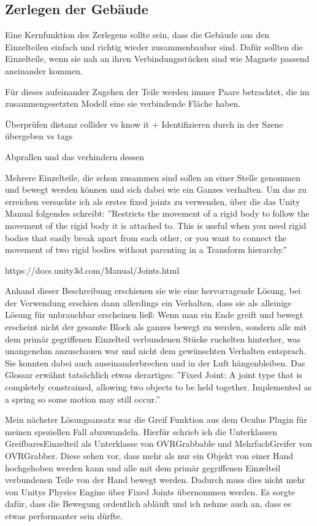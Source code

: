 \documentclass[11pt]{article} %
\begin{document}
\subsection{Zerlegen der Gebäude}

Eine Kernfunktion des Zerlegens sollte sein, dass die Gebäude aus den Einzelteilen einfach und richtig wieder zusammenbaubar sind. Dafür sollten die Einzelteile, wenn sie nah an ihren Verbindungsstücken sind wie Magnete passend aneinander kommen.

Für dieses aufeinander Zugehen der Teile werden immer Paare betrachtet, die im zusammengesetzten Modell eine sie verbindende Fläche haben. 

Überprüfen distanz collider vs know it  +  Identifizieren durch in der Szene übergeben vs tags 

Abprallen und das verhindern dessen

Mehrere Einzelteile, die schon zusammen sind sollen an einer Stelle genommen und bewegt werden können und sich dabei wie ein Ganzes verhalten.
Um das zu erreichen versuchte ich als erstes fixed joints zu verwenden, über die das Unity Manual folgendes schreibt: 
''Restricts the movement of a rigid body to follow the movement of the rigid body it is attached to. This is useful when you need rigid bodies that easily break apart from each other, or you want to connect the movement of two rigid bodies without parenting in a Transform hierarchy.'' 

https://docs.unity3d.com/Manual/Joints.html

Anhand dieser Beschreibung erschienen sie wie eine hervorragende Lösung, bei der Verwendung erschien dann allerdings ein Verhalten, dass sie als alleinige Lösung für unbrauchbar erscheinen ließ: Wenn man ein Ende greift und bewegt erscheint nicht der gesamte Block als ganzes bewegt zu werden, sondern alle mit dem primär gegriffenen Einzelteil verbundenen Stücke ruckelten hinterher, was unangenehm anzuschauen war und nicht dem gewünschten Verhalten entsprach.
Sie konnten dabei auch auseinanderbrechen und in der Luft hängenbleiben.
Das Glossar erwähnt tatsächlich etwas derartiges: \newline
''Fixed Joint: A joint type that is completely constrained, allowing two objects to be held together. Implemented as a spring so some motion may still occur.'' \newline

Mein nächster Lösungsansatz war die Greif Funktion aus dem Oculus Plugin für meinen speziellen Fall abzuwandeln. Hierfür schrieb ich die Unterklassen GreifbaresEinzelteil als Unterklasse von OVRGrabbable und MehrfachGreifer von OVRGrabber.
Diese sehen vor, dass mehr als nur ein Objekt von einer Hand hochgehoben werden kann und alle mit dem primär gegriffenen Einzelteil verbundenen Teile von der Hand bewegt werden. Dadurch muss dies nicht mehr von Unitys Physics Engine über Fixed Joints übernommen werden.
Es sorgte dafür, dass die Bewegung ordentlich abläuft und ich nehme auch an, dass es etwas performanter sein dürfte.
\end{document}
